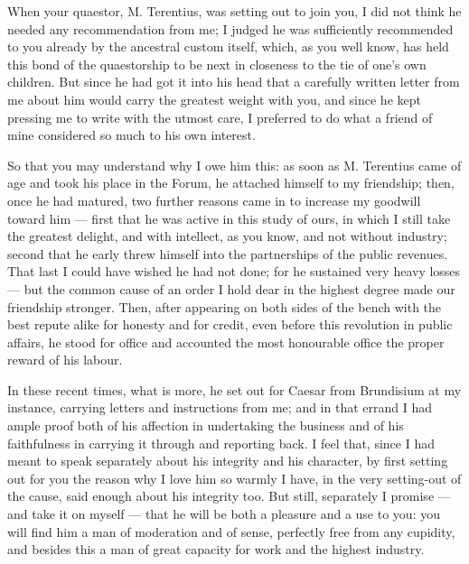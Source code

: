 

 When your quaestor, M. Terentius, was setting out to join you, I did not think he needed any recommendation from me; I judged he was sufficiently recommended to you already by the ancestral custom itself, which, as you well know, has held this bond of the quaestorship to be next in closeness to the tie of one's own children. But since he had got it into his head that a carefully written letter from me about him would carry the greatest weight with you, and since he kept pressing me to write with the utmost care, I preferred to do what a friend of mine considered so much to his own interest.

 So that you may understand why I owe him this: as soon as M. Terentius came of age and took his place in the Forum, he attached himself to my friendship; then, once he had matured, two further reasons came in to increase my goodwill toward him --- first that he was active in this study of ours, in which I still take the greatest delight, and with intellect, as you know, and not without industry; second that he early threw himself into the partnerships of the public revenues. That last I could have wished he had not done; for he sustained very heavy losses --- but the common cause of an order I hold dear in the highest degree made our friendship stronger. Then, after appearing on both sides of the bench with the best repute alike for honesty and for credit, even before this revolution in public affairs, he stood for office and accounted the most honourable office the proper reward of his labour.

 In these recent times, what is more, he set out for Caesar from Brundisium at my instance, carrying letters and instructions from me; and in that errand I had ample proof both of his affection in undertaking the business and of his faithfulness in carrying it through and reporting back. I feel that, since I had meant to speak separately about his integrity and his character, by first setting out for you the reason why I love him so warmly I have, in the very setting-out of the cause, said enough about his integrity too. But still, separately I promise --- and take it on myself --- that he will be both a pleasure and a use to you: you will find him a man of moderation and of sense, perfectly free from any cupidity, and besides this a man of great capacity for work and the highest industry.

